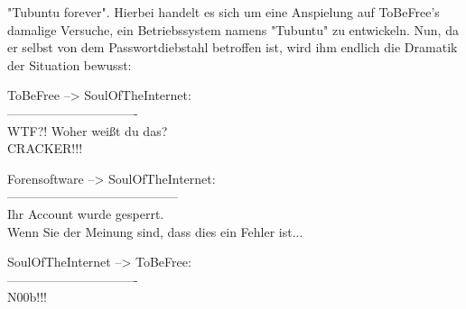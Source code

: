 "Tubuntu forever". Hierbei handelt es sich um eine Anspielung auf ToBeFree's damalige Versuche, ein Betriebssystem namens "Tubuntu" zu entwickeln. Nun, da er selbst von dem Passwortdiebstahl betroffen ist, wird ihm endlich die Dramatik der Situation bewusst:

\noindent \parbox{\textwidth}{

    \begin{footnotesize}
    \begin{itshape}
    \begin{flushright}

\noindent ToBeFree --> SoulOfTheInternet:\\
\noindent -------------------------------\\
 WTF?! Woher weißt du das?\\
\noindent CRACKER!!!\\

    \end{flushright}
    \end{itshape}
    \end{footnotesize}

}


\noindent \parbox{\textwidth}{

    \begin{footnotesize}
    \begin{itshape}
    \begin{flushright}

\noindent Forensoftware --> SoulOfTheInternet:\\
\noindent -----------------------------------------\\
\noindent Ihr Account wurde gesperrt.\\
\noindent Wenn Sie der Meinung sind, dass dies ein Fehler ist...\\

    \end{flushright}
    \end{itshape}
    \end{footnotesize}

}

\noindent \parbox{\textwidth}{

    \begin{footnotesize}
    \begin{itshape}

\noindent SoulOfTheInternet --> ToBeFree:\\
\noindent -------------------------------\\
\noindent N00b!!!\\

    \end{itshape}
    \end{footnotesize}

}

